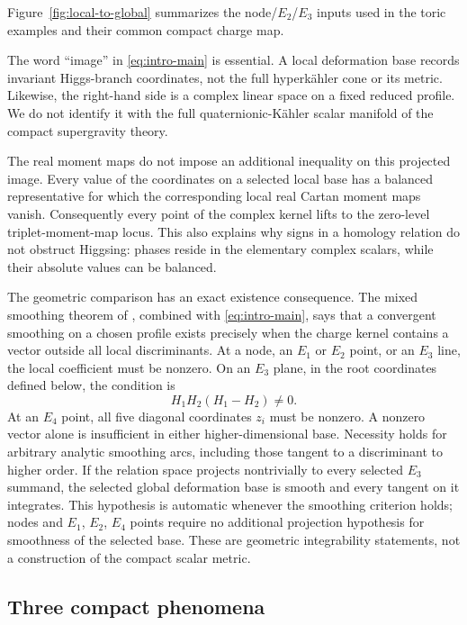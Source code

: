 Figure~\ref{fig:local-to-global} summarizes the node/$E_2$/$E_3$ inputs
used in the toric examples and their common compact charge map.


The word ``image'' in \eqref{eq:intro-main} is essential. A local deformation
base records invariant Higgs-branch coordinates, not the full
hyperk\"ahler cone or its metric. Likewise, the right-hand side is a complex
linear space on a fixed reduced profile. We do not identify it with the full
quaternionic-K\"ahler scalar manifold of the compact supergravity theory.

The real moment maps do not impose an additional inequality on this projected
image. Every value of the coordinates on a selected local base has a
balanced representative for which the corresponding local real Cartan moment
maps vanish. Consequently every point of the complex kernel lifts to the
zero-level triplet-moment-map locus. This also explains why signs in a homology
relation do not obstruct Higgsing: phases reside in the elementary complex
scalars, while their absolute values can be balanced.

The geometric comparison has an exact existence consequence. The mixed
smoothing theorem of \cite[Theorems~4.5 and~4.7]{Wuebben:2026smoothing},
combined with \eqref{eq:intro-main}, says that a convergent smoothing on a
chosen profile exists precisely when the charge kernel contains a vector
outside all local discriminants. At a node, an $E_1$ or $E_2$ point, or an $E_3$ line,
the local coefficient must be nonzero. On an $E_3$ plane, in the root
coordinates defined below, the condition is
\begin{equation}
 H_1H_2(H_1-H_2)\ne0.
 \label{eq:intro-e3-discriminant}
\end{equation}
At an $E_4$ point, all five diagonal coordinates $z_i$ must be nonzero.
A nonzero vector alone is insufficient in either higher-dimensional base.
Necessity holds for arbitrary
analytic smoothing arcs, including those tangent to a discriminant to higher
order. If the relation space projects nontrivially to every selected $E_3$
summand, the selected global deformation base is smooth and every tangent
on it integrates. This hypothesis is automatic whenever the smoothing
criterion holds; nodes and $E_1$, $E_2$, $E_4$ points require no additional projection
hypothesis for smoothness of the selected base. These are geometric
integrability statements, not a construction of the compact scalar metric.

\subsection*{Three compact phenomena}

